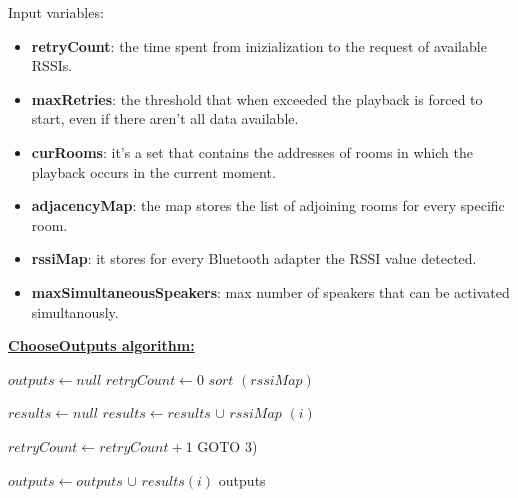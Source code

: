 \documentclass[conference]{IEEEtran}
\begin{document}
Input variables:
\begin{itemize}
\item \textbf{retryCount}: the time spent from inizialization to the request of available RSSIs.
\item \textbf{maxRetries}: the threshold that when exceeded the playback is forced to start, even if there aren't all data available.
\item \textbf{curRooms}: it's a set that contains the addresses of rooms in which the playback occurs in the current moment.
\item \textbf{adjacencyMap}: the map stores the list of adjoining rooms for every specific room.
\item \textbf{rssiMap}: it stores for every Bluetooth adapter the RSSI value detected.
\item \textbf{maxSimultaneousSpeakers}: max number of speakers that can be activated simultanously.
\end{itemize}
\textbf{\underline{ChooseOutputs algorithm:}}
\vspace{0.3cm}
\begin{algorithmic}[1]

\STATE $outputs \gets null$ 
\STATE $retryCount \gets 0$
\STATE $sort$ $(rssiMap)$ 

\STATE $results \gets null$
\STATE $results \gets results$ $\cup$ $rssiMap$ $(i)$ 
\ENDFOR

\STATE $ retryCount \gets retryCount + 1 $ 
\STATE GOTO 3)
\ENDIF

		\STATE $outputs \gets outputs$ $\cup$ $results(i)$ 
	\ENDIF
\ENDFOR
\RETURN outputs
\end{algorithmic}
\end{document}
